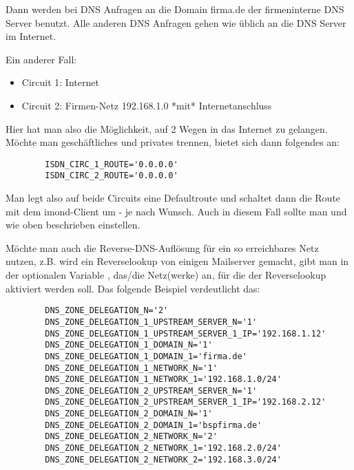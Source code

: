 \begin{description}
{      Dann werden bei DNS Anfragen an die Domain firma.de der
      firmeninterne DNS Server benutzt. Alle anderen DNS Anfragen
      gehen wie üblich an die DNS Server im Internet.

      Ein anderer Fall:
      \begin{itemize}
      \item Circuit 1: Internet
      \item Circuit 2: Firmen-Netz 192.168.1.0 *mit* Internetanschluss
      \end{itemize}

      Hier hat man also die Möglichkeit, auf 2 Wegen in das Internet
      zu gelangen. Möchte man geschäftliches und privates trennen,
      bietet sich dann folgendes an:

\begin{example}
\begin{verbatim}
        ISDN_CIRC_1_ROUTE='0.0.0.0'
        ISDN_CIRC_2_ROUTE='0.0.0.0'
\end{verbatim}
\end{example}

      Man legt also auf beide Circuits eine Defaultroute und schaltet
      dann die Route mit dem imond-Client um - je nach Wunsch. Auch in
      diesem Fall sollte man 
      und  wie oben
      beschrieben einstellen.}

      Möchte man auch die Reverse-DNS-Auflösung für ein so
      erreichbares Netz nutzen, z.B. wird ein Reverselookup von
      einigen Mailserver gemacht, gibt man in der optionalen
      Variable , das/die
      Netz(werke) an, für die der Reverselookup aktiviert werden soll.
      Das folgende Beispiel verdeutlicht das:

\begin{example}
\begin{verbatim}
        DNS_ZONE_DELEGATION_N='2'
        DNS_ZONE_DELEGATION_1_UPSTREAM_SERVER_N='1'
        DNS_ZONE_DELEGATION_1_UPSTREAM_SERVER_1_IP='192.168.1.12'
        DNS_ZONE_DELEGATION_1_DOMAIN_N='1'
        DNS_ZONE_DELEGATION_1_DOMAIN_1='firma.de'
        DNS_ZONE_DELEGATION_1_NETWORK_N='1'
        DNS_ZONE_DELEGATION_1_NETWORK_1='192.168.1.0/24'
        DNS_ZONE_DELEGATION_2_UPSTREAM_SERVER_N='1'
        DNS_ZONE_DELEGATION_2_UPSTREAM_SERVER_1_IP='192.168.2.12'
        DNS_ZONE_DELEGATION_2_DOMAIN_N='1'
        DNS_ZONE_DELEGATION_2_DOMAIN_1='bspfirma.de'
        DNS_ZONE_DELEGATION_2_NETWORK_N='2'
        DNS_ZONE_DELEGATION_2_NETWORK_1='192.168.2.0/24'
        DNS_ZONE_DELEGATION_2_NETWORK_2='192.168.3.0/24'
\end{verbatim}
\end{example}


\end{description}
